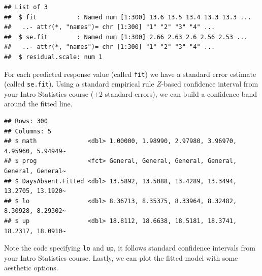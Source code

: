 \documentclass[
]{book}
\newenvironment{Shaded}{\begin{snugshade}}{\end{snugshade}}
\newcommand{\AttributeTok}[1]{\textcolor[rgb]{0.13,0.29,0.53}{#1}}
\newcommand{\FloatTok}[1]{\textcolor[rgb]{0.00,0.00,0.81}{#1}}
\newcommand{\FunctionTok}[1]{\textcolor[rgb]{0.13,0.29,0.53}{\textbf{#1}}}
\newcommand{\NormalTok}[1]{#1}
\newcommand{\OtherTok}[1]{\textcolor[rgb]{0.56,0.35,0.01}{#1}}
\newcommand{\SpecialCharTok}[1]{\textcolor[rgb]{0.81,0.36,0.00}{\textbf{#1}}}
\begin{document}
\begin{verbatim}
## List of 3
##  $ fit           : Named num [1:300] 13.6 13.5 13.4 13.3 13.3 ...
##   ..- attr(*, "names")= chr [1:300] "1" "2" "3" "4" ...
##  $ se.fit        : Named num [1:300] 2.66 2.63 2.6 2.56 2.53 ...
##   ..- attr(*, "names")= chr [1:300] "1" "2" "3" "4" ...
##  $ residual.scale: num 1
\end{verbatim}

For each predicted response value (called \texttt{fit}) we have a standard error estimate (called \texttt{se.fit}). Using a standard empirical rule \(Z\)-based confidence interval from your Intro Statistics course (\(\pm 2\) standard errors), we can build a confidence band around the fitted line.

\begin{Shaded}
\end{Shaded}

\begin{verbatim}
## Rows: 300
## Columns: 5
## $ math              <dbl> 1.00000, 1.98990, 2.97980, 3.96970, 4.95960, 5.94949~
## $ prog              <fct> General, General, General, General, General, General~
## $ DaysAbsent.Fitted <dbl> 13.5892, 13.5088, 13.4289, 13.3494, 13.2705, 13.1920~
## $ lo                <dbl> 8.36713, 8.35375, 8.33964, 8.32482, 8.30928, 8.29302~
## $ up                <dbl> 18.8112, 18.6638, 18.5181, 18.3741, 18.2317, 18.0910~
\end{verbatim}

Note the code specifying \texttt{lo} and \texttt{up}, it follows standard confidence intervals from your Intro Statistics course.
Lastly, we can plot the fitted model with some aesthetic options.
\end{document}
